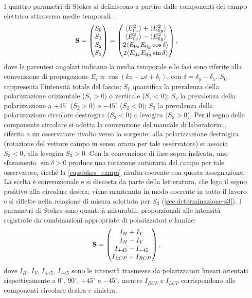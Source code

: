 I quattro parametri di Stokes si definiscono a partire dalle componenti del campo elettrico attraverso medie temporali~\cite{collett2005polarized}:
\begin{equation}
\label{eq:stokes_campi}
\mathbf{S} = \begin{pmatrix} S_0 \\ S_1 \\ S_2 \\ S_3 \end{pmatrix} = \begin{pmatrix} \langle E_{0x}^2 \rangle + \langle E_{0y}^2 \rangle \\ \langle E_{0x}^2 \rangle - \langle E_{0y}^2 \rangle \\ 2\langle E_{0x} E_{0y} \cos\delta \rangle \\ 2\langle E_{0x} E_{0y} \sin\delta \rangle \end{pmatrix},
\end{equation}
dove le parentesi angolari indicano la media temporale e le fasi sono riferite alla convenzione di propagazione $E_i \propto \cos(kz - \omega t + \delta_i)$, con $\delta = \delta_y - \delta_x$. $S_0$ rappresenta l'intensità totale del fascio; $S_1$ quantifica la prevalenza della polarizzazione orizzontale ($S_1 > 0$) o verticale ($S_1 < 0$); $S_2$ la prevalenza della polarizzazione a $+45^\circ$ ($S_2 > 0$) o $-45^\circ$ ($S_2 < 0$); $S_3$ la prevalenza della polarizzazione circolare destrogira ($S_3 < 0$) o levogira ($S_3 > 0$). Per il segno della componente circolare si adotta la convenzione del manuale di laboratorio~\cite{manuale_polarizzazione}, riferita a un osservatore rivolto verso la sorgente: alla polarizzazione destrogira (rotazione del vettore campo in senso orario per tale osservatore) si associa $S_3 < 0$, alla levogira $S_3 > 0$. Con la convenzione di fase sopra indicata, uno sfasamento $\sin\delta > 0$ produce una rotazione antioraria del campo per tale osservatore, sicché la \cref{eq:stokes_campi} risulta coerente con questa assegnazione. La scelta è convenzionale e si discosta da parte della letteratura, che lega il segno positivo alla circolare destra; viene mantenuta in modo coerente in tutto il lavoro e si riflette nella relazione di misura adottata per $S_3$ (\cref{sec:determinazione-s3}). I parametri di Stokes sono quantità misurabili, proporzionali alle intensità registrate da combinazioni appropriate di polarizzatori e lamine:
\begin{equation}
\label{eq:stokes_intensita}
\mathbf{S} = \begin{pmatrix} I_H + I_V \\ I_H - I_V \\ I_{+45} - I_{-45} \\ I_{LCP} - I_{RCP} \end{pmatrix},
\end{equation}
dove $I_H$, $I_V$, $I_{+45}$, $I_{-45}$ sono le intensità trasmesse da polarizzatori lineari orientati rispettivamente a $0^\circ$, $90^\circ$, $+45^\circ$ e $-45^\circ$, mentre $I_{RCP}$ e $I_{LCP}$ corrispondono alle componenti circolare destra e sinistra.

